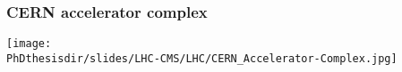 \begin{frame}
\frametitle{CERN accelerator complex}
\begin{center}
\texttt{[image: \\PhDthesisdir/slides/LHC-CMS/LHC/CERN\_Accelerator-Complex.jpg]}
\end{center}
\end{frame}
